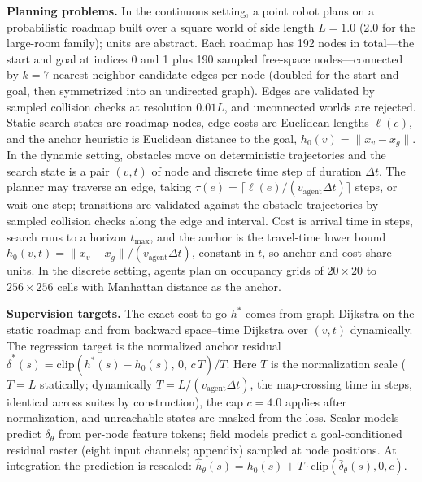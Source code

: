 \documentclass[letterpaper]{article} %
\begin{document}
\textbf{Planning problems.} In the continuous setting, a point robot plans on a probabilistic roadmap \citep[PRM;][]{kavraki1996prm} built over a square world of side length $L{=}1.0$ ($2.0$ for the large-room family); units are abstract. Each roadmap has 192 nodes in total---the start and goal at indices 0 and 1 plus 190 sampled free-space nodes---connected by $k{=}7$ nearest-neighbor candidate edges per node (doubled for the start and goal, then symmetrized into an undirected graph). Edges are validated by sampled collision checks at resolution $0.01L$, and unconnected worlds are rejected. Static search states are roadmap nodes, edge costs are Euclidean lengths $\ell(e)$, and the anchor heuristic is Euclidean distance to the goal, $h_0(v) = \lVert x_v - x_g \rVert$. In the dynamic setting, obstacles move on deterministic trajectories and the search state is a pair $(v,t)$ of node and discrete time step of duration $\Delta t$. The planner may traverse an edge, taking $\tau(e) = \lceil \ell(e) / (v_{\mathrm{agent}} \Delta t) \rceil$ steps, or wait one step; transitions are validated against the obstacle trajectories by sampled collision checks along the edge and interval. Cost is arrival time in steps, search runs to a horizon $t_{\max}$, and the anchor is the travel-time lower bound $h_0(v,t) = \lVert x_v - x_g \rVert / (v_{\mathrm{agent}} \Delta t)$, constant in $t$, so anchor and cost share units. In the discrete setting, agents plan on occupancy grids of $20{\times}20$ to $256{\times}256$ cells with Manhattan distance as the anchor.

\textbf{Supervision targets.} The exact cost-to-go $h^{*}$ comes from graph Dijkstra on the static roadmap and from backward space--time Dijkstra over $(v,t)$ dynamically. The regression target is the normalized anchor residual $\bar\delta^{*}(s) = \mathrm{clip}\!\left(h^{*}(s) - h_0(s),\, 0,\, c\,T\right)/T$. Here $T$ is the normalization scale ($T{=}L$ statically; dynamically $T = L/(v_{\mathrm{agent}}\Delta t)$, the map-crossing time in steps, identical across suites by construction), the cap $c{=}4.0$ applies after normalization, and unreachable states are masked from the loss. Scalar models predict $\bar\delta_\theta$ from per-node feature tokens; field models predict a goal-conditioned residual raster (eight input channels; appendix) sampled at node positions. At integration the prediction is rescaled: $\hat h_\theta(s) = h_0(s) + T \cdot \mathrm{clip}(\bar\delta_\theta(s), 0, c)$.
\end{document}
